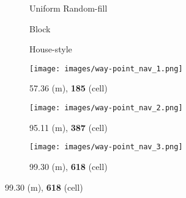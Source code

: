 \documentclass[journal, twocolumn]{IEEEtran}
\begin{document}
\begin{figure}[]
  \begin{subfigure}[b]{0.01\linewidth}
  \centering
    \caption*{}
    \end{subfigure}
    \hfill
  \begin{subfigure}[b]{0.31\linewidth}
  \caption*{\scriptsize Uniform Random-fill}
  \end{subfigure}
  \hfill
  \begin{subfigure}[b]{0.31\linewidth}
  \caption*{\scriptsize Block}
  \end{subfigure}
  \hfill
  \begin{subfigure}[b]{0.31\linewidth}
  \caption*{\scriptsize House-style}
  \end{subfigure}
  \hfill
  \vspace{-.5 mm}    
  \begin{subfigure}[b]{0.01\linewidth}
  \centering
    \caption*{}
    \end{subfigure}
    \hfill
  \begin{subfigure}[b]{0.31\linewidth}
    \texttt{[image: images/way-point\_nav\_1.png]}
     \caption{\scriptsize 57.36 (m), \textbf{185} (cell)}

  \end{subfigure}
  \hfill
  \begin{subfigure}[b]{0.31\linewidth}
    \texttt{[image: images/way-point\_nav\_2.png]}
     \caption{\scriptsize 95.11 (m), \textbf{387} (cell)}
     
  \end{subfigure}
  \hfill
  \begin{subfigure}[b]{0.31\linewidth}
    \texttt{[image: images/way-point\_nav\_3.png]}
     \caption{\scriptsize 99.30 (m), \textbf{618} (cell)}
  \end{subfigure}
  \label{fig: Way runs}


\end{figure}
\end{document}
